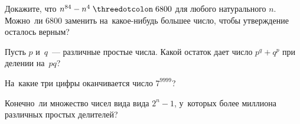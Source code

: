 \begin{problems}
\item
\subproblem
Докажите, что $n^{84} - n^{4} \kratno 6800$ для любого натурального $n$.
\\
\subproblem
Можно~ли $6800$ заменить на~какое-нибудь большее число, чтобы утверждение
осталось верным?

\item
Пусть $p$ и~$q$~--- различные простые числа.
Какой остаток дает число $p^{q} + q^{p}$ при делении на~$p q$?

\item
На~какие три цифры оканчивается число $7^{9999}$?

\item
Конечно~ли множество чисел вида вида $2^{n} - 1$, у~которых более миллиона
различных простых делителей?







\end{problems}

\endgroup %

